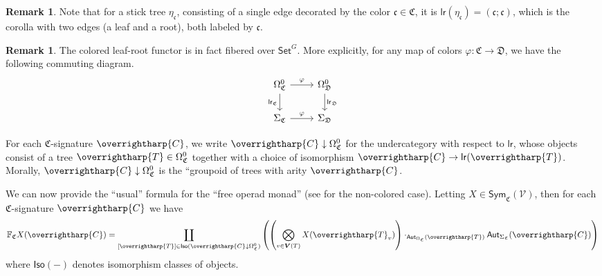 \documentclass[a4paper,10pt
,draft
]{article}%
\numberwithin{equation}{section}
\numberwithin{figure}{section}
\theoremstyle{definition} %
\newtheorem{remark}[equation]{Remark}%
\newcommand{\vect}[1]{\text{\overrightharp{\ensuremath{#1}}}}
\newcommand{\V}{\ensuremath{\mathcal V}}
\newcommand{\1}{\ensuremath{\mathbbm 1}}%
\begin{document}
\begin{remark}\label{ETACNOT REM}
	Note that for a stick tree $\eta_{\mathfrak{c}}$,
	consisting of a single edge decorated by the color 
	$\mathfrak{c} \in \mathfrak{C}$,
	it is 
	$\mathsf{lr}(\eta_{\mathfrak{c}}) = (\mathfrak{c};\mathfrak{c})$,
	which is the corolla with two edges (a leaf and a root),
	both labeled by $\mathfrak{c}$.
\end{remark}

\begin{remark}
	The colored leaf-root functor is in fact fibered over $\mathsf{Set}^G$.
	More explicitly, for any map of colors 
	$\varphi \colon \mathfrak C \to \mathfrak D$,
	we have the following commuting diagram.
	\begin{equation}
	\label{COLORLR_EQ}
	\begin{tikzcd}
	\Omega_{\mathfrak C}^0 \arrow[r, "\varphi"] \arrow[d, "\mathsf{lr}_{\mathfrak C}"']
	&
	\Omega_{\mathfrak D}^0 \arrow[d, "\mathsf{lr}_{\mathfrak D}"]
	\\
	\Sigma_{\mathfrak C} \arrow[r, "\varphi"]
	&
	\Sigma_{\mathfrak D}
	\end{tikzcd}
	\end{equation}
\end{remark}

For each $\mathfrak{C}$-signature $\vect{C}$,
we write $\vect{C} \downarrow \Omega_{\mathfrak{C}}^0$
for the undercategory with respect to $\mathsf{lr}$, 
whose objects consist of a tree $\vect{T}\in \Omega_{\mathfrak{C}}^0$
together with a choice of isomorphism 
$\vect{C} \to \mathsf{lr}(\vect{T})$.
Morally, $\vect{C} \downarrow \Omega_{\mathfrak{C}}^0$
is the ``groupoid of trees with arity $\vect{C}$. 

We can now provide the ``usual'' formula for the ``free operad monad'' 
(see \cite[page 816]{BM07} for the non-colored case).
Letting $X \in \mathsf{Sym}_{\mathfrak{C}}(\V)$,
then for each $\mathfrak{C}$-signature $\vect{C}$ we have
\begin{equation}
        \label{FROPEXP EQ}
        \mathbb{F}_{\mathfrak{C}} X (\vect{C})
        =
        \coprod_{[\vect{T}] \in 
          \mathsf{Iso}(\vect{C} \downarrow \Omega^0_{\mathfrak{C}})}
        \left(
                \left(
                        \bigotimes_{v \in \boldsymbol{V}(T)} X(\vect{T}_v)
                \right)
                \cdot_{\mathsf{Aut}_{\Omega_{\mathfrak{C}}}(\vect{T})}
                \mathsf{Aut}_{\Sigma_{\mathfrak{C}}}(\vect{C})
        \right)
\end{equation}
where $\mathsf{Iso}(-)$ denotes isomorphism classes of objects.
\end{document}
